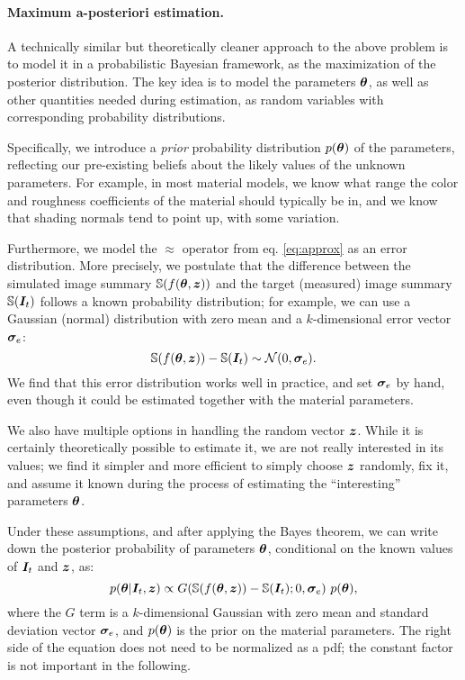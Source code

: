 \paragraph{Maximum a-posteriori estimation.} A technically similar but theoretically cleaner approach to the above problem is to model it in a probabilistic Bayesian framework, as the maximization of the posterior distribution. The key idea is to model the parameters $\bm{\theta}$, as well as other quantities needed during estimation, as random variables with corresponding probability distributions.

Specifically, we introduce a \emph{prior} probability distribution $p(\bm{\theta})$ of the parameters, reflecting our pre-existing beliefs about the likely values of the unknown parameters. For example, in most material models, we know what range the color and roughness coefficients of the material should typically be in, and we know that shading normals tend to point up, with some variation.

Furthermore, we model the $\approx$ operator from eq. \ref{eq:approx} as an error distribution. More precisely, we postulate that the difference between the simulated image summary $\mathbb{S}(f(\bm{\theta}, \bm{z}))$ and the target (measured) image summary $\mathbb{S}(\bm{I}_t)$ follows a known probability distribution; for example, we can use a Gaussian (normal) distribution with zero mean and a $k$-dimensional error vector $\bm{\sigma}_e$:
\begin{equation}
	\mathbb{S}(f(\bm{\theta}, \bm{z})) - \mathbb{S}(\bm{I}_t) \sim \mathcal N(0, \bm{\sigma}_e).
\end{equation}
We find that this error distribution works well in practice, and set $\bm{\sigma}_e$ by hand, even though it could be estimated together with the material parameters.

We also have multiple options in handling the random vector $\bm{z}$. While it is certainly theoretically possible to estimate it, we are not really interested in its values;  we find it simpler and more efficient to simply choose $\bm{z}$ randomly, fix it, and assume it known during the process of estimating the ``interesting'' parameters $\bm{\theta}$.

Under these assumptions, and after applying the Bayes theorem, we can write down the posterior probability of parameters $\bm{\theta}$, conditional on the known values of $\bm{I}_t$ and $\bm{z}$, as:
\begin{equation} \label{eq:posterior}
	p(\bm{\theta} | \bm{I}_t, \bm{z}) \propto G(\mathbb{S}(f(\bm{\theta}, \bm{z})) - \mathbb{S}(\bm{I}_t); 0, \bm{\sigma}_e) \ p(\bm{\theta}),
\end{equation}
where the $G$ term is a $k$-dimensional Gaussian with zero mean and standard deviation vector $\bm{\sigma}_e$, and $p(\bm{\theta})$ is the prior on the material parameters.
The right side of the equation does not need to be normalized as a pdf; the constant factor is not important in the following.


